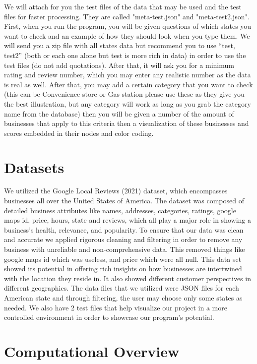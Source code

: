 \documentclass[fontsize=11pt]{article}
\begin{document}
We will attach for you the test files of the data that may be used and the test files for faster processing. They are called "meta-test.json" and "meta-test2.json". First, when you run the program, you will be given questions of which states you want to check and an example of how they should look when you type them. We will send you a zip file with all states data but recommend you to use ``test, test2'' (both or each one alone but test is more rich in data) in order to use the test files (do not add quotations). After that, it will ask you for a minimum rating and review number, which you may enter any realistic number as the data is real as well. After that, you may add a certain category that you want to check (this can be Convenience store or Gas station please use these as they give you the best illustration, but any category will work as long as you grab the category name from the database) then you will be given a number of the amount of businesses that apply to this criteria then a visualization of these businesses and scores embedded in their nodes and color coding.

\section*{Datasets}

We utilized the Google Local Reviews (2021) dataset, which encompasses businesses all over the United States of America. The dataset was composed of detailed business attributes like names, addresses, categories, ratings, google maps id, price, hours, state and reviews, which all play a major role in showing a business's health, relevance, and popularity. To ensure that our data was clean and accurate we applied rigorous cleaning and filtering in order to remove any business with unreliable and non-comprehensive data. This removed things like google maps id which was useless, and price which were all null. This data set showed its potential in offering rich insights on how businesses are intertwined with the location they reside in. It also showed different customer perspectives in different geographies. The data files that we utilized were JSON files for each American state and through filtering, the user may choose only some states as needed. We also have 2 test files that help visualize our project in a more controlled environment in order to showcase our program's potential.

\section*{Computational Overview}
\end{document}
